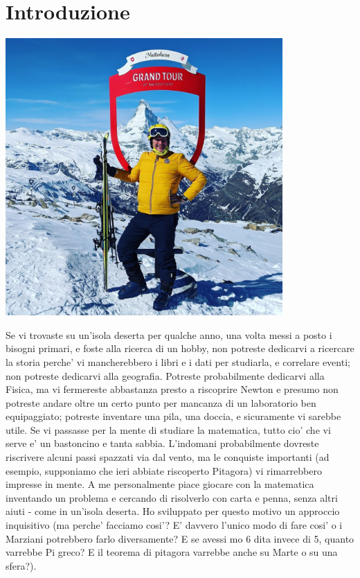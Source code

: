 \label{introduzione}
\setcounter{chapter}{-1}
\chapter{Introduzione}



\includegraphics[height = 300pt, width = 300pt]{images/RiccardoMatterhorn.jpeg}

Se vi trovaste su un'isola deserta per qualche anno, una volta messi a posto i bisogni primari, e foste alla ricerca di un hobby, non potreste dedicarvi a ricercare la storia
perche' vi mancherebbero i libri e i dati per studiarla, e correlare eventi; non potreste dedicarvi alla geografia. Potreste probabilmente dedicarvi alla Fisica, ma vi fermereste
abbastanza presto a riscoprire Newton e presumo non potreste andare oltre un certo punto per mancanza di un laboratorio ben equipaggiato; potreste inventare una pila, una doccia,
e sicuramente vi sarebbe utile. Se vi passasse per la mente di studiare la matematica, tutto cio' che vi serve e' un bastoncino e tanta sabbia. L'indomani probabilmente dovreste
riscrivere alcuni passi spazzati via dal vento, ma le conquiste importanti (ad esempio, supponiamo che ieri abbiate riscoperto Pitagora) vi rimarrebbero impresse in mente.
A me personalmente piace giocare con la matematica inventando un problema e cercando di risolverlo con carta e penna, senza altri aiuti - come in un'isola deserta. Ho sviluppato 
per questo motivo un approccio inquisitivo (ma perche' facciamo cosi'? E' davvero l'unico modo di fare cosi' o i Marziani potrebbero farlo diversamente? E se avessi mo 6 dita
invece di 5, quanto varrebbe Pi greco? E il teorema di pitagora varrebbe anche su Marte o su una sfera?).

